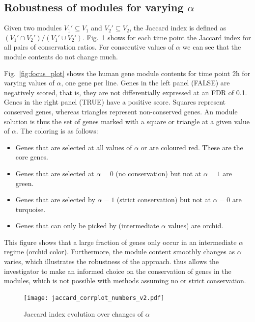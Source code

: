   \subsection{Robustness of modules for varying $\alpha$}

  Given two modules $V_1' \subseteq V_1$ and $V_2' \subseteq V_2$, the
  Jaccard index is defined as $(V_1' \cap V_2')/(V_1' \cup
    V_2')$. Fig.~\ref{fig:jaccard_alpha} shows for each time point the
  Jaccard index for all pairs of conservation ratios. For consecutive
  values of $\alpha$ we can see that the module contents do not change
  much.

  Fig.~\ref{fig:focus_plot} shows the human gene module contents for time
  point \unit{2}{h} for varying values of $\alpha$, one gene per
  line. Genes in the left panel (FALSE) are negatively scored, that is,
  they are not differentially expressed at an FDR of 0.1. Genes in the
  right panel (TRUE) have a positive score. Squares represent conserved genes,
  whereas triangles represent non-conserved genes. An \xheinz module
  solution is thus the set of genes marked with a square or
  triangle at a given value of $\alpha$. The coloring is as follows:
  \begin{itemize}
  \item Genes that are selected at all values of $\alpha$ or
    are coloured red. These are the core genes. 
  \item Genes that are selected at $\alpha=0$ (no conservation)
    but not at $\alpha = 1$ are green. 
  \item Genes that are selected by $\alpha=1$
    (strict conservation) but not at $\alpha=0$ are turquoise. 
  \item Genes that can only be picked by \xheinz (intermediate $\alpha$ values)
    are orchid.
  \end{itemize}

  This figure shows that a large fraction of genes
  only occur in an intermediate $\alpha$ regime (orchid
  color). Furthermore, the module content smoothly changes as $\alpha$
  varies, which illustrates the robustness of the approach. \xheinz thus
  allows the investigator to make an informed choice on the conservation
  of genes in the modules, which is not possible with methods assuming
  no or strict conservation.

  \begin{figure}[b]
    \centering
    \texttt{[image: jaccard\_corrplot\_numbers\_v2.pdf]}
    \caption{Jaccard index evolution over changes of $\alpha$}
    \label{fig:jaccard_alpha}
  \end{figure}

